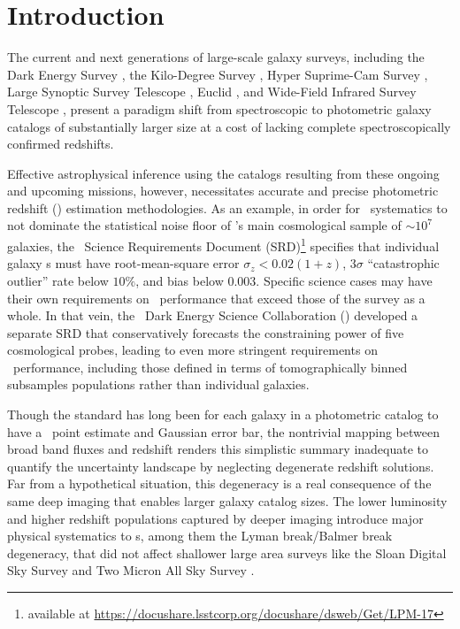 \section{Introduction}
\label{sec:intro}

The current and next generations of large-scale galaxy surveys, including the Dark Energy Survey \citep[\textsc{DES},][]{Abbott:05}, the Kilo-Degree Survey \citep[\textsc{KiDS},][]{de_Jong:13}, Hyper Suprime-Cam Survey \citep[\textsc{HSC},][]{Aihara:2018a,Aihara:2018b}, Large Synoptic Survey Telescope \citep[\lsst,][]{Abell:09}, Euclid \citep{Laureijs:11}, and Wide-Field Infrared Survey Telescope \citep[\textsc{WFIRST},][]{Green:12}, present a paradigm shift from spectroscopic to photometric galaxy catalogs of substantially larger size at a cost of lacking complete spectroscopically confirmed redshifts.

Effective astrophysical inference using the catalogs resulting from these ongoing and upcoming missions, however, necessitates accurate and precise photometric redshift (\pz) estimation methodologies.
As an example, in order for \pz\ systematics to not dominate the statistical noise floor of \lsst's main cosmological sample of $\sim 10^{7}$ galaxies, the \lsst\ Science Requirements Document (SRD)\footnote{available at \url{https://docushare.lsstcorp.org/docushare/dsweb/Get/LPM-17}} specifies that individual galaxy \pz s must have root-mean-square error $\sigma_z < 0.02 (1+z)$, $3 \sigma$ ``catastrophic outlier'' rate below $10\%$, and bias below $0.003$.
Specific science cases may have their own requirements on \pz\ performance that exceed those of the survey as a whole.
In that vein, the \lsst\ Dark Energy Science Collaboration (\lsstdesc) developed a separate SRD \citep{Mandelbaum:2018} that conservatively forecasts the constraining power of five cosmological probes, leading to even more stringent requirements on \pz\ performance, including those defined in terms of tomographically binned subsamples populations rather than individual galaxies.

Though the standard has long been for each galaxy in a photometric catalog to have a \pz\ point estimate and Gaussian error bar, the nontrivial mapping between broad band fluxes and redshift renders this simplistic summary inadequate to quantify the uncertainty landscape by neglecting degenerate redshift solutions.
Far from a hypothetical situation, this degeneracy is a real consequence of the same deep imaging that enables larger galaxy catalog sizes.
The lower luminosity and higher redshift populations captured by deeper imaging introduce major physical systematics to \pz s, among them the Lyman break/Balmer break degeneracy, that did not affect shallower large area surveys like the Sloan Digital Sky Survey \citep[\textsc{SDSS},][]{York:00} and Two Micron All Sky Survey \citep[\textsc{2MASS},][]{Skrutskie:06}.

